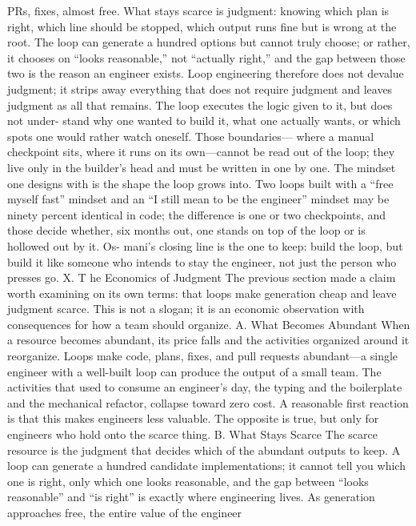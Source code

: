 \documentclass[conference]{IEEEtran}
\begin{document}

PRs, fixes, almost free. What stays scarce is judgment: knowing
which plan is right, which line should be stopped, which output
runs fine but is wrong at the root. The loop can generate a
hundred options but cannot truly choose; or rather, it chooses
on “looks reasonable,” not “actually right,” and the gap between
those two is the reason an engineer exists. Loop engineering
therefore does not devalue judgment; it strips away everything
that does not require judgment and leaves judgment as all that
remains.
The loop executes the logic given to it, but does not under-
stand why one wanted to build it, what one actually wants, or
which spots one would rather watch oneself. Those boundaries—
where a manual checkpoint sits, where it runs on its own—cannot
be read out of the loop; they live only in the builder’s head and
must be written in one by one. The mindset one designs with
is the shape the loop grows into. Two loops built with a “free
myself fast” mindset and an “I still mean to be the engineer”
mindset may be ninety percent identical in code; the difference
is one or two checkpoints, and those decide whether, six months
out, one stands on top of the loop or is hollowed out by it. Os-
mani’s closing line is the one to keep: build the loop, but build
it like someone who intends to stay the engineer, not just the
person who presses go.
X. T he Economics of Judgment
The previous section made a claim worth examining on its
own terms: that loops make generation cheap and leave judgment
scarce. This is not a slogan; it is an economic observation with
consequences for how a team should organize.
A. What Becomes Abundant
When a resource becomes abundant, its price falls and the
activities organized around it reorganize. Loops make code,
plans, fixes, and pull requests abundant—a single engineer with
a well-built loop can produce the output of a small team. The
activities that used to consume an engineer’s day, the typing and
the boilerplate and the mechanical refactor, collapse toward zero
cost. A reasonable first reaction is that this makes engineers less
valuable. The opposite is true, but only for engineers who hold
onto the scarce thing.
B. What Stays Scarce
The scarce resource is the judgment that decides which of
the abundant outputs to keep. A loop can generate a hundred
candidate implementations; it cannot tell you which one is right,
only which one looks reasonable, and the gap between “looks
reasonable” and “is right” is exactly where engineering lives.
As generation approaches free, the entire value of the engineer
\end{document}
